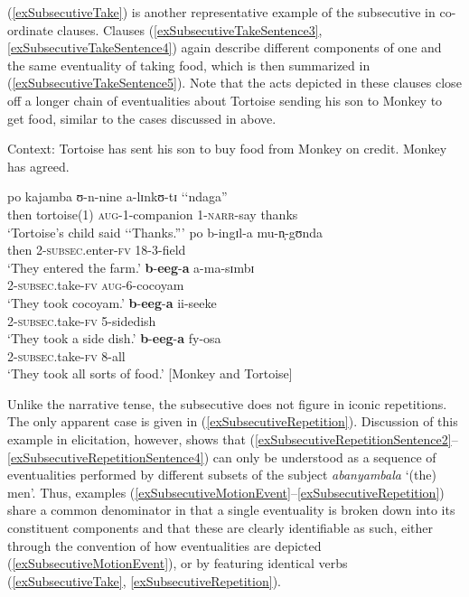 (\ref{exSubsecutiveTake}) is another representative example of the subsecutive in co-ordinate clauses. Clauses (\ref{exSubsecutiveTakeSentence3}, \ref{exSubsecutiveTakeSentence4}) again describe different components of one and the same eventuality of taking food, which is then summarized in (\ref{exSubsecutiveTakeSentence5}). Note that the acts depicted in these clauses close off a longer chain of eventualities about Tortoise sending his son to Monkey to get food, similar to the cases discussed in  above.

\begin{exe}
\ex\label{exSubsecutiveTake} Context: Tortoise has sent his son to buy food from Monkey on credit. Monkey has agreed.
\begin{xlist}
\ex \label{exSubsecutiveTakeSentence1}
\gll po kajamba ʊ-n-nine a-lɪnkʊ-tɪ \textup{\lq\lq}ndaga\textup{''}\\
then tortoise(1) \textsc{aug}-1-companion 1-\textsc{narr}-say \phantom{\lq\lq}thanks\\
\glt \lq Tortoise's child said \lq\lq Thanks.''{}'
\ex \label{exSubsecutiveTakeSentence2}
\gll po b-ingɪl-a mu-n̩-gʊnda\\
then 2-\textsc{subsec}.enter-\textsc{fv} 18-3-field\\
\glt \lq They entered the farm.'
\ex \label{exSubsecutiveTakeSentence3}
\gll \textbf{b}-\textbf{eeg}-\textbf{a} a-ma-sɪmbɪ\\
2-\textsc{subsec}.take-\textsc{fv} \textsc{aug}-6-cocoyam\\
\glt \lq They took cocoyam.'
\ex \label{exSubsecutiveTakeSentence4}
\gll \textbf{b}-\textbf{eeg}-\textbf{a} ii-seeke\\
2-\textsc{subsec}.take-\textsc{fv} 5-sidedish\\
\glt \lq They took a side dish.'
\ex \label{exSubsecutiveTakeSentence5}
\gll \textbf{b}-\textbf{eeg}-\textbf{a} fy-osa\\
2-\textsc{subsec}.take-\textsc{fv} 8-all\\
\glt \lq They took all sorts of food.' [Monkey and Tortoise]
\end{xlist}
\end{exe}

Unlike the narrative tense, the subsecutive does not figure in iconic repetitions. The only apparent case is given in (\ref{exSubsecutiveRepetition}). Discussion of this example in elicitation, however, shows that (\ref{exSubsecutiveRepetitionSentence2}--\ref{exSubsecutiveRepetitionSentence4}) can only be understood as a sequence of eventualities performed by different subsets of the subject \textit{abanyambala} \lq (the) men'. Thus, examples (\ref{exSubsecutiveMotionEvent}--\ref{exSubsecutiveRepetition}) share a common denominator in that a single eventuality is broken down into its constituent components and that these are clearly identifiable as such, either through the convention of how  eventualities are depicted (\ref{exSubsecutiveMotionEvent}), or by featuring identical verbs (\ref{exSubsecutiveTake}, \ref{exSubsecutiveRepetition}).

